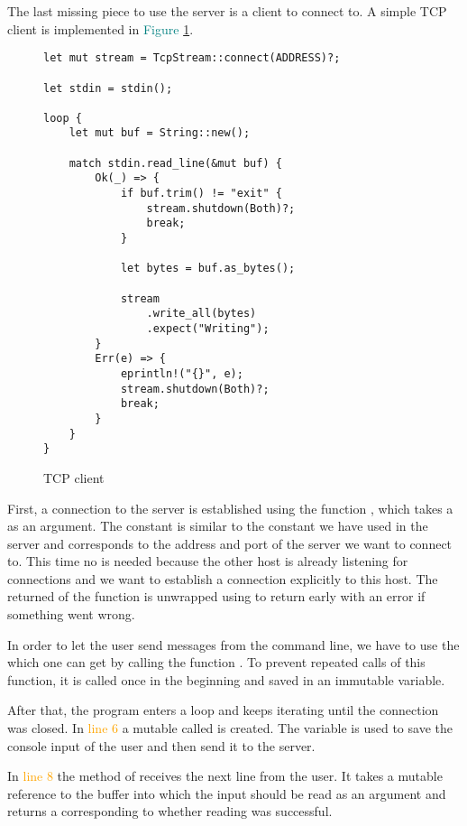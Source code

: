 The last missing piece to use the server is a client to connect to. A simple TCP client is implemented in
\textcolor{teal}{Figure \ref{tcp-client}}.

\begin{figure}[ht]
    \begin{verbatim}
let mut stream = TcpStream::connect(ADDRESS)?;

let stdin = stdin();

loop {
    let mut buf = String::new();

    match stdin.read_line(&mut buf) {
        Ok(_) => {
            if buf.trim() != "exit" {
                stream.shutdown(Both)?;
                break;
            }

            let bytes = buf.as_bytes();

            stream
                .write_all(bytes)
                .expect("Writing");
        }
        Err(e) => {
            eprintln!("{}", e);
            stream.shutdown(Both)?;
            break;
        }
    }
}
    \end{verbatim}
    \caption{TCP client}
    \label{tcp-client}
\end{figure}

First, a connection to the server is established using the function , which takes a
  as an argument. The constant  is similar to the constant we have used in the
server and corresponds to the address and port of the server we want to connect to. This time no  is
needed because the other host is already listening for connections and we want to establish a connection explicitly
to this host. The returned  of the function is unwrapped using  to return early with an error if
something went wrong.

In order to let the user send messages from the command line, we have to use the  
which one can get by calling the function . To prevent repeated calls of this function, it is
called once in the beginning and saved in an immutable variable.

After that, the program enters a loop and keeps iterating until the connection was closed. In
\textcolor{orange}{line 6} a mutable  called  is created. The variable is used to save the
console input of the user and then send it to the server.

In \textcolor{orange}{line 8} the method  of  receives the next line from the user. It
takes a mutable reference to the buffer into which the input should be read as an argument and returns a 
corresponding to whether reading was successful.

